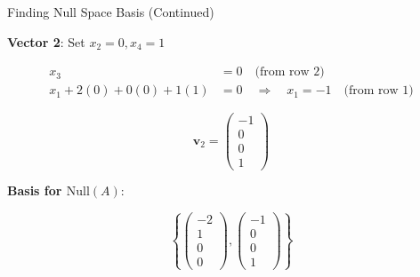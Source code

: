 \documentclass[10pt]{beamer}
\theoremstyle{definition}
\newcommand{\x}[1]{\alert{\textbf{#1}}}
\begin{document}
\begin{frame}{Finding Null Space Basis (Continued)}

\x{Vector 2}: Set $x_2 = 0, x_4 = 1$

\begin{align*}
x_3 &= 0 \quad \text{(from row 2)} \\
x_1 + 2(0) + 0(0) + 1(1) &= 0 \quad \Rightarrow \quad x_1 = -1 \quad \text{(from row 1)}
\end{align*}

$$\mathbf{v}_2 = \begin{pmatrix} -1 \\ 0 \\ 0 \\ 1 \end{pmatrix}$$

\vspace{1em}

\x{Basis for $\text{Null}(A)$}:

$$\left\{ \begin{pmatrix} -2 \\ 1 \\ 0 \\ 0 \end{pmatrix}, \begin{pmatrix} -1 \\ 0 \\ 0 \\ 1 \end{pmatrix} \right\}$$

\end{frame}
\end{document}
